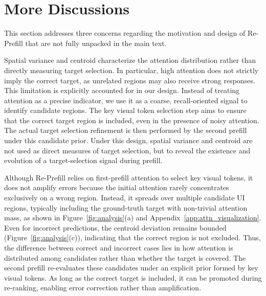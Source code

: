 \documentclass{article}
\begin{document}
\section{More Discussions}
\label{app:more_discussions}

This section addresses three concerns regarding the motivation and design of Re-Prefill that are not fully unpacked in the main text.


Spatial variance and centroid characterize the attention distribution rather than directly measuring target selection. In particular, high attention does not strictly imply the correct target, as unrelated regions may also receive strong responses.
This limitation is explicitly accounted for in our design. Instead of treating attention as a precise indicator, we use it as a coarse, recall-oriented signal to identify candidate regions. The key visual token selection step aims to ensure that the correct target region is included, even in the presence of noisy attention. The actual target selection refinement is then performed by the second prefill under this candidate prior.
Under this design, spatial variance and centroid are not used as direct measures of target selection, but to reveal the existence and evolution of a target-selection signal during prefill. 


Although Re-Prefill relies on first-prefill attention to select key visual tokens, it does not amplify errors because the initial attention rarely concentrates exclusively on a wrong region. Instead, it spreads over multiple candidate UI regions, typically including the ground-truth target with non-trivial attention mass, as shown in Figure~\ref{fig:analysis}(a) and Appendix~\ref{app:attn_visualization}. 
Even for incorrect predictions, the centroid deviation remains bounded (Figure~\ref{fig:analysis}(c)), indicating that the correct region is not excluded.
Thus, the difference between correct and incorrect cases lies in how attention is distributed among candidates rather than whether the target is covered. The second prefill re-evaluates these candidates under an explicit prior formed by key visual tokens. As long as the correct target is included, it can be promoted during re-ranking, enabling error correction rather than amplification.
\end{document}
